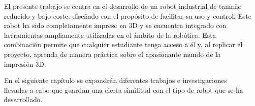 El presente trabajo se centra en el desarrollo de un robot industrial de tamaño reducido y bajo coste, diseñado con el propósito de 
facilitar su uso y control. Este robot ha sido completamente impreso en 3D y se encuentra integrado con herramientas ampliamente 
utilizadas en el ámbito de la robótica. Esta combinación permite que cualquier estudiante tenga acceso a él y, al replicar el proyecto, 
aprenda de manera práctica sobre el apasionante mundo de la impresión 3D.

En el siguiente capítulo se expondrán diferentes trabajos e investigaciones llevadas a cabo que guardan una cierta similitud con el tipo de robot 
que se ha desarrollado.